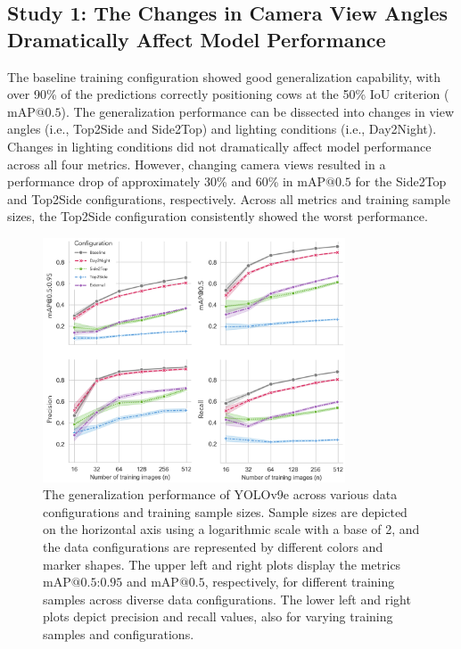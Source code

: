 \subsection*{Study 1: The Changes in Camera View Angles Dramatically Affect Model Performance}

The baseline training configuration showed good generalization capability, with over 90\% of the predictions correctly positioning cows at the 50\% IoU criterion ($\text{mAP@{0.5}}$). The generalization performance can be dissected into changes in view angles (i.e., Top2Side and Side2Top) and lighting conditions (i.e., Day2Night). Changes in lighting conditions did not dramatically affect model performance across all four metrics. However, changing camera views resulted in a performance drop of approximately 30\% and 60\% in $\text{mAP@{0.5}}$ for the Side2Top and Top2Side configurations, respectively. Across all metrics and training sample sizes, the Top2Side configuration consistently showed the worst performance.

\begin{figure}[h]
    \centering
    \includegraphics[width=0.8\textwidth]{figure_3.jpg}
    \caption{The generalization performance of YOLOv9e across various data configurations and training sample sizes. Sample sizes are depicted on the horizontal axis using a logarithmic scale with a base of 2, and the data configurations are represented by different colors and marker shapes. The upper left and right plots display the metrics $\text{mAP@{0.5:0.95}}$ and $\text{mAP@{0.5}}$, respectively, for different training samples across diverse data configurations. The lower left and right plots depict precision and recall values, also for varying training samples and configurations.}
    \label{fig:schemes}
\end{figure}

